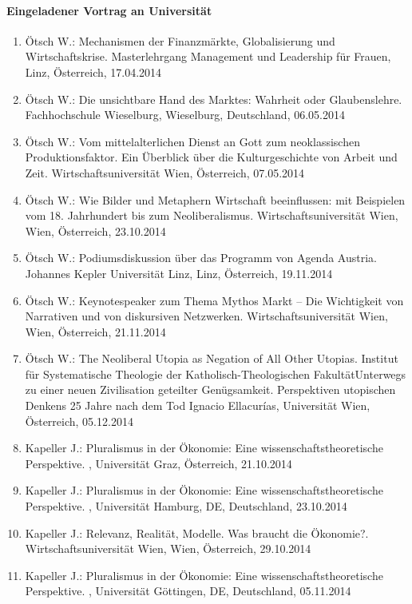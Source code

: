 \paragraph{Eingeladener Vortrag an Universität}
\begin{enumerate}
	\item Ötsch W.: Mechanismen der Finanzmärkte, Globalisierung und Wirtschaftskrise. Masterlehrgang Management und Leadership für Frauen, Linz, Österreich, 17.04.2014
	\item Ötsch W.: Die unsichtbare Hand des Marktes: Wahrheit oder Glaubenslehre. Fachhochschule Wieselburg, Wieselburg, Deutschland, 06.05.2014
	\item Ötsch W.: Vom mittelalterlichen Dienst an Gott zum neoklassischen Produktionsfaktor. Ein Überblick über die Kulturgeschichte von Arbeit und Zeit. Wirtschaftsuniversität Wien, Österreich, 07.05.2014
	\item Ötsch W.: Wie Bilder und Metaphern Wirtschaft beeinflussen: mit Beispielen vom 18. Jahrhundert bis zum Neoliberalismus. Wirtschaftsuniversität Wien, Wien, Österreich, 23.10.2014
	\item Ötsch W.: Podiumsdiskussion über das Programm von \glqq Agenda Austria\grqq{}. Johannes Kepler Universität Linz, Linz, Österreich, 19.11.2014
	\item Ötsch W.: Keynotespeaker zum Thema Mythos Markt – Die Wichtigkeit von Narrativen und von diskursiven Netzwerken. Wirtschaftsuniversität Wien, Wien, Österreich, 21.11.2014
	\item Ötsch W.: The Neoliberal Utopia as Negation of All Other Utopias. Institut für Systematische Theologie der Katholisch-Theologischen FakultätUnterwegs zu einer neuen Zivilisation geteilter Genügsamkeit. Perspektiven utopischen Denkens 25 Jahre nach dem Tod Ignacio Ellacurías, Universität Wien, Österreich, 05.12.2014
	\item Kapeller J.: Pluralismus in der Ökonomie: Eine wissenschaftstheoretische Perspektive. , Universität Graz, Österreich, 21.10.2014
	\item Kapeller J.: Pluralismus in der Ökonomie: Eine wissenschaftstheoretische Perspektive. , Universität Hamburg, DE, Deutschland, 23.10.2014
	\item Kapeller J.: Relevanz, Realität, Modelle. Was braucht die Ökonomie?. Wirtschaftsuniversität Wien, Wien, Österreich, 29.10.2014
	\item Kapeller J.: Pluralismus in der Ökonomie: Eine wissenschaftstheoretische Perspektive. , Universität Göttingen, DE, Deutschland, 05.11.2014

\end{enumerate}
